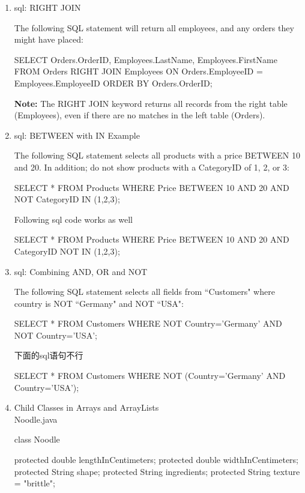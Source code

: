 \documentclass[a4paper,12pt]{article}
\begin{document}
\fontsize{14pt}{15.6pt}
\selectfont

\begin{enumerate}

\item sql: RIGHT JOIN

The following SQL statement will return all employees, and any orders they might have placed:
\begin{sqlcode}
SELECT Orders.OrderID, Employees.LastName, Employees.FirstName
FROM Orders
RIGHT JOIN Employees ON Orders.EmployeeID = Employees.EmployeeID
ORDER BY Orders.OrderID;
\end{sqlcode}
\textbf{Note:} The RIGHT JOIN keyword returns all records from the right table (Employees), even if there are no matches in the left table (Orders).

\item sql: BETWEEN with IN Example

The following SQL statement selects all products with a price BETWEEN 10 and 20. In addition; do not show products with a CategoryID of 1, 2, or 3:
\begin{sqlcode}
SELECT * FROM Products
WHERE Price BETWEEN 10 AND 20
AND NOT CategoryID IN (1,2,3);
\end{sqlcode}

Following sql code works as well
\begin{sqlcode}
SELECT * FROM Products
WHERE Price BETWEEN 10 AND 20
AND CategoryID NOT IN (1,2,3);
\end{sqlcode}

\item sql: Combining AND, OR and NOT

The following SQL statement selects all fields from ``Customers" where country is NOT ``Germany" and NOT ``USA":
\begin{sqlcode}
SELECT * FROM Customers
WHERE NOT Country='Germany' AND NOT Country='USA';
\end{sqlcode}

下面的sql语句不行
\begin{sqlcode}
SELECT * FROM Customers 
WHERE NOT (Country='Germany' AND Country='USA');
\end{sqlcode}

\item Child Classes in Arrays and ArrayLists\\
Noodle.java
\begin{javacode}
class Noodle {  
  protected double lengthInCentimeters;
  protected double widthInCentimeters;
  protected String shape;
  protected String ingredients;
  protected String texture = "brittle";
  
}
\end{javacode}
\end{enumerate}
\end{document}
